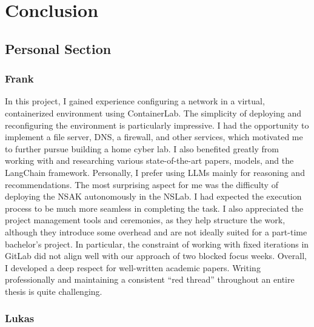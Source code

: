 
\chapter{Conclusion}\label{ch:conclusion}

\section{Personal Section}\label{sec:personal-section}

\subsection{Frank}\label{subsec:peronal-section-frank}

In this project, I gained experience configuring a network in a virtual, containerized environment using ContainerLab.
The simplicity of deploying and reconfiguring the environment is particularly impressive.
I had the opportunity to implement a file server, \gls{DNS}, a firewall, and other services, which motivated me to further pursue building a home cyber lab.
I also benefited greatly from working with and researching various state-of-the-art papers, models, and the LangChain framework.
Personally, I prefer using \glspl{LLM} mainly for reasoning and recommendations.
The most surprising aspect for me was the difficulty of deploying the \gls{NSAK} autonomously in the NSLab.
I had expected the execution process to be much more seamless in completing the task.
I also appreciated the project management tools and ceremonies, as they help structure the work, although they introduce some overhead and are not ideally suited for a part-time bachelor’s project.
In particular, the constraint of working with fixed iterations in GitLab did not align well with our approach of two blocked focus weeks.
Overall, I developed a deep respect for well-written academic papers.
Writing professionally and maintaining a consistent \enquote{red thread} throughout an entire thesis is quite challenging.


\subsection{Lukas}\label{subsec:personal-section-lukas}

